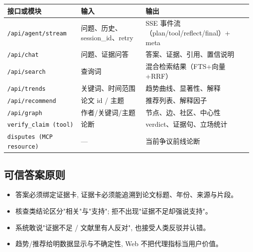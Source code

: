 \begin{center}
\begin{tabularx}{\textwidth}{p{34mm}X X}
\toprule
接口或模块 & 输入 & 输出 \\
\midrule
\texttt{/api/agent/stream} & 问题、历史、session\_id、retry & SSE 事件流（plan/tool/reflect/final）+ meta \\
\texttt{/api/chat} & 问题、证据问答 & 答案、证据、引用、置信说明 \\
\texttt{/api/search} & 查询词 & 混合检索结果（FTS+向量+RRF） \\
\texttt{/api/trends} & 关键词、时间范围 & 趋势曲线、显著性、解释 \\
\texttt{/api/recommend} & 论文 id / 主题 & 推荐列表、解释因子 \\
\texttt{/api/graph} & 作者/关键词/主题 & 节点、边、社区、中心性 \\
\texttt{verify\_claim (tool)} & 论断 & verdict、证据句、立场统计 \\
\texttt{disputes (MCP resource)} & — & 当前争议前线论断 \\
\bottomrule
\end{tabularx}
\end{center}

\subsection{可信答案原则}

\begin{itemize}
  \item 答案必须绑定证据卡, 证据卡必须能追溯到论文标题、年份、来源与片段。
  \item 核查类结论区分"相关"与"支持"; 拒不出现"证据不足却强说支持"。
  \item 系统敢说"证据不足 / 文献里有人反对", 也接受人类反驳并认错。
  \item 趋势/推荐给明数据显示与不确定性, Web 不把代理指标当用户价值。
\end{itemize}

\clearpage